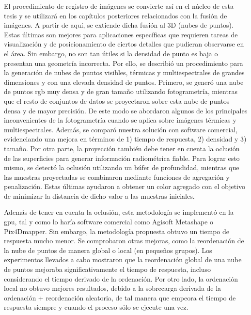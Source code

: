 El procedimiento de registro de imágenes se convierte así en el núcleo de esta tesis y se utilizará en los capítulos posteriores relacionados con la fusión de imágenes. A partir de aquí, se extiende dicha fusión al 3D (nubes de puntos). Estas últimas son mejores para aplicaciones específicas que requieren tareas de visualización y de posicionamiento de ciertos detalles que pudieran observarse en el área. Sin embargo, no son tan útiles si la densidad de punto es baja o presentan una geometría incorrecta. Por ello, se describió un procedimiento para la generación de nubes de puntos visibles, térmicas y multiespectrales de grandes dimensiones y con una elevada densidad de puntos. Primero, se generó una nube de puntos \acrshort{rgb} muy densa y de gran tamaño utilizando fotogrametría, mientras que el resto de conjuntos de datos se proyectaron sobre esta nube de puntos densa y de mayor precisión. De este modo se abordaron algunos de los principales inconvenientes de la fotogrametría cuando se aplica sobre imágenes térmicas y multiespectrales. Además, se comparó nuestra solución con software comercial, evidenciando una mejora  en términos de 1) tiempo de respuesta, 2) densidad y 3) tamaño. Por otra parte, la proyección también debe tener en cuenta la oclusión de las superficies para generar información radiométrica fiable. Para lograr esto mismo, se detectó la oclusión utilizando un búfer de profundidad, mientras que las muestras proyectadas se combinaron mediante funciones de agregación y penalización. Estas últimas ayudaron a obtener un color agregado con el objetivo de minimizar la distancia de dicho valor a las muestras iniciales. 

Además de tener en cuenta la oclusión, esta metodología se implementó en la \acrshort{gpu}, tal y como lo haría software comercial como Agisoft Metashape o Pix4Dmapper. Sin embargo, la metodología propuesta obtuvo un tiempo de respuesta mucho menor. Se comprobaron otras mejoras, como la reordenación de la nube de puntos de manera global o local (en pequeños grupos). Los experimentos llevados a cabo mostraron que la reordenación global de una nube de puntos mejoraba significativamente el tiempo de respuesta, incluso considerando el tiempo derivado de la ordenación. Por otro lado, la ordenación local no obtuvo mejores resultados, debido a la sobrecarga derivada de la ordenación + reordenación aleatoria, de tal manera que empeora el tiempo de respuesta siempre y cuando el proceso sólo se ejecute una vez.

